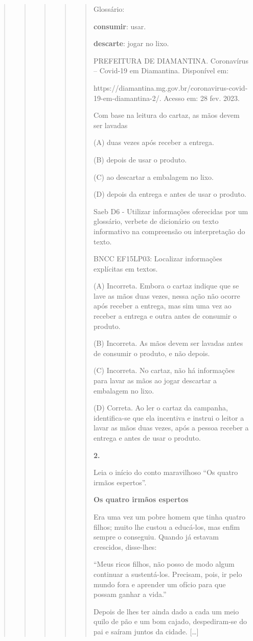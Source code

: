 \begin{quote}
\begin{quote}
\begin{quote}
\begin{quote}
\begin{quote}
Glossário:

\textbf{consumir}: usar.

\textbf{descarte}: jogar no lixo.

PREFEITURA DE DIAMANTINA. Coronavírus -- Covid-19 em Diamantina.
Disponível em:

https://diamantina.mg.gov.br/coronavirus-covid-19-em-diamantina-2/.
Acesso em: 28 fev. 2023.

Com base na leitura do cartaz, as mãos devem ser lavadas

(A) duas vezes após receber a entrega.

(B) depois de usar o produto.

(C) ao descartar a embalagem no lixo.

(D) depois da entrega e antes de usar o produto.

Saeb D6 - Utilizar informações oferecidas por um glossário, verbete de
dicionário ou texto informativo na compreensão ou interpretação do
texto.

BNCC EF15LP03: Localizar informações explícitas em textos.

(A) Incorreta. Embora o cartaz indique que se lave as mãos duas vezes,
nessa ação não ocorre após receber a entrega, mas sim uma vez ao receber
a entrega e outra antes de consumir o produto.

(B) Incorreta. As mãos devem ser lavadas antes de consumir o produto, e
não depois.

(C) Incorreta. No cartaz, não há informações para lavar as mãos ao jogar
descartar a embalagem no lixo.

(D) Correta. Ao ler o cartaz da campanha, identifica-se que ela
incentiva e instrui o leitor a lavar as mãos duas vezes, após a pessoa
receber a entrega e antes de usar o produto.

\textbf{2.}

Leia o início do conto maravilhoso ``Os quatro irmãos espertos''.

\textbf{Os quatro irmãos espertos}

Era uma vez um pobre homem que tinha quatro filhos; muito lhe custou a
educá-los, mas enfim sempre o conseguiu. Quando já estavam crescidos,
disse-lhes:

``Meus ricos filhos, não posso de modo algum continuar a sustentá-los.
Precisam, pois, ir pelo mundo fora e aprender um ofício para que possam
ganhar a vida.''

Depois de lhes ter ainda dado a cada um meio quilo de pão e um bom
cajado, despediram-se do pai e saíram juntos da cidade. {[}\ldots{}{]}


\end{quote}
\end{quote}
\end{quote}
\end{quote}
\end{quote}
